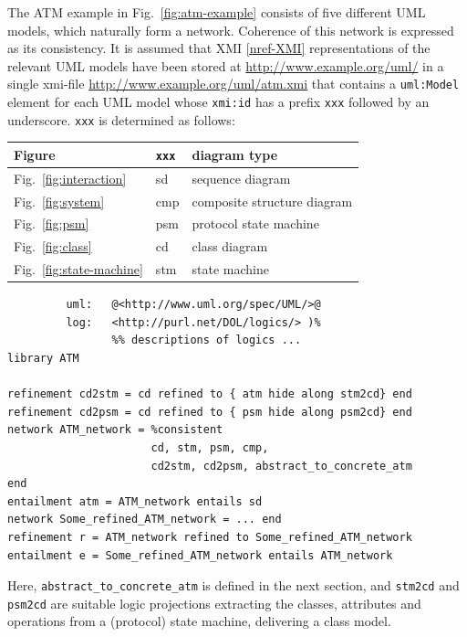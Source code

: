 \documentclass[10pt, a4paper]{isov2}
\renewcommand{\noterefname}{note}
\renewcommand{\nref}[1]{\noterefname~\ref{#1}}
\renewcommand{\nref}[1]{\ref{nref-#1}}
\begin{document}
The ATM example in Fig.~\ref{fig:atm-example} consists of five different
UML models, which naturally form a network. Coherence of this network is
expressed as its consistency.  It is assumed that XMI \nref{XMI} representations of
the relevant UML models have been stored at
\url{http://www.example.org/uml/} in a single xmi-file \url{http://www.example.org/uml/atm.xmi} that contains a
\texttt{uml:Model} element for each UML model whose \texttt{xmi:id} has
a prefix \texttt{xxx} followed by an underscore. \texttt{xxx} is determined 
as follows:\medskip

\begin{tabular}{|l|l|l|}\hline
\textbf{Figure} & \textbf{\texttt{xxx}} & \textbf{diagram type}\\\hline
Fig.~\ref{fig:interaction} & sd & sequence diagram\\\hline
Fig.~\ref{fig:system} & cmp & composite structure diagram\\\hline
Fig.~\ref{fig:psm} & psm & protocol state machine\\\hline
Fig.~\ref{fig:class} & cd & class diagram\\\hline
Fig.~\ref{fig:state-machine} & stm & state machine\\\hline
\end{tabular}

\begin{lstlisting}[basicstyle=\ttfamily,language=dolText,escapechar=@,mathescape]
%prefix( :      <http://www.example.org/uml/>
         uml:   @<http://www.uml.org/spec/UML/>@
         log:   <http://purl.net/DOL/logics/> )%
                %% descriptions of logics ...
library ATM

refinement cd2stm = cd refined to { atm hide along stm2cd} end
refinement cd2psm = cd refined to { psm hide along psm2cd} end
network ATM_network = %consistent
                      cd, stm, psm, cmp,
                      cd2stm, cd2psm, abstract_to_concrete_atm
end
entailment atm = ATM_network entails sd
network Some_refined_ATM_network = ... end
refinement r = ATM_network refined to Some_refined_ATM_network
entailment e = Some_refined_ATM_network entails ATM_network
\end{lstlisting}
Here, \texttt{abstract\_to\_concrete\_atm} is defined in the next
section, and \texttt{stm2cd} and \texttt{psm2cd} are suitable logic
projections extracting the classes, attributes and operations from a
(protocol) state machine, delivering a class model.


\end{document}
